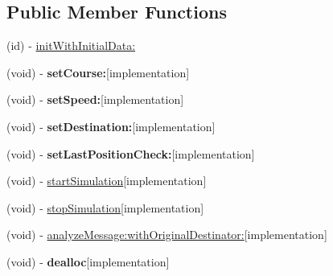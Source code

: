 \subsection*{\-Public \-Member \-Functions}
\begin{DoxyCompactItemize}
\item 
(id) -\/ \hyperlink{interface_airplane_a4cd0671cfd995a78a594f1b47aaf25bd}{init\-With\-Initial\-Data\-:}
\item 
\hypertarget{interface_airplane_a4b031466149b2e6be2fcb7e1f4444ecb}{
(void) -\/ {\bfseries set\-Course\-:}{\ttfamily  \mbox{[}implementation\mbox{]}}}
\label{interface_airplane_a4b031466149b2e6be2fcb7e1f4444ecb}

\item 
\hypertarget{interface_airplane_a1e84a055df9ee4361766d1e2d8ca9237}{
(void) -\/ {\bfseries set\-Speed\-:}{\ttfamily  \mbox{[}implementation\mbox{]}}}
\label{interface_airplane_a1e84a055df9ee4361766d1e2d8ca9237}

\item 
\hypertarget{interface_airplane_a7ea31c35eecc0cb5441458ea9096e4aa}{
(void) -\/ {\bfseries set\-Destination\-:}{\ttfamily  \mbox{[}implementation\mbox{]}}}
\label{interface_airplane_a7ea31c35eecc0cb5441458ea9096e4aa}

\item 
\hypertarget{interface_airplane_ae0bae343afd146a22f00b33bbc56bab8}{
(void) -\/ {\bfseries set\-Last\-Position\-Check\-:}{\ttfamily  \mbox{[}implementation\mbox{]}}}
\label{interface_airplane_ae0bae343afd146a22f00b33bbc56bab8}

\item 
(void) -\/ \hyperlink{interface_airplane_ac72298feeb1eabb6930d59d87a6b769e}{start\-Simulation}{\ttfamily  \mbox{[}implementation\mbox{]}}
\item 
(void) -\/ \hyperlink{interface_airplane_a88f2c57f879dfc9f1799a4d31b8d8d2d}{stop\-Simulation}{\ttfamily  \mbox{[}implementation\mbox{]}}
\item 
(void) -\/ \hyperlink{interface_airplane_ae11a6a90304a9b78bdd2653b6a62a1ed}{analyze\-Message\-:with\-Original\-Destinator\-:}{\ttfamily  \mbox{[}implementation\mbox{]}}
\item 
\hypertarget{interface_airplane_a589eeedbcf0abb117387c66b3e617be1}{
(void) -\/ {\bfseries dealloc}{\ttfamily  \mbox{[}implementation\mbox{]}}}
\label{interface_airplane_a589eeedbcf0abb117387c66b3e617be1}

\end{DoxyCompactItemize}
